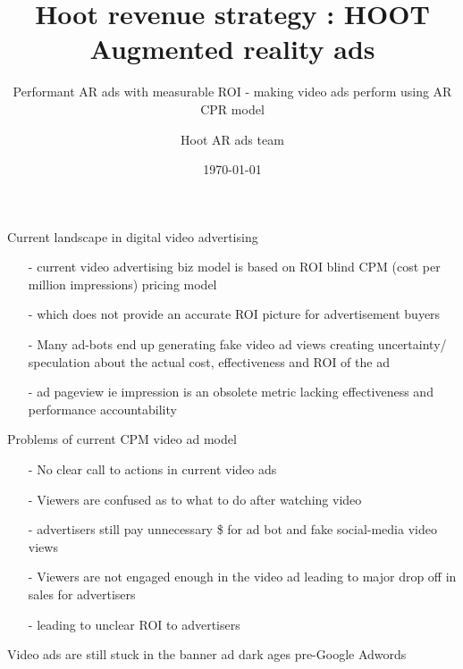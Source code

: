 \documentclass[12pt]{beamer}
\title{ Hoot revenue strategy : HOOT Augmented reality ads}
\subtitle{Performant AR ads with measurable ROI  - making video ads perform using AR CPR model}
\date{\today}
\author{Hoot AR ads team}
\institute{Hoot Live inc., a Delaware C-corp}
\begin{document}
\maketitle



\begin{frame}[fragile]{Current landscape in digital video advertising}

\begin{itemize}
\item[-]current video advertising biz model is based on ROI blind CPM (cost per million impressions) pricing model
\item[-]which does not provide an accurate ROI picture for advertisement buyers
  \pause
\item[-]Many ad-bots end up generating fake video ad views creating uncertainty/ speculation about the actual cost, effectiveness and ROI of the ad
\pause
\item[-]ad pageview ie impression is an obsolete metric lacking effectiveness and performance accountability
\end{itemize}

\end{frame}
\begin{frame}[t]{Problems of current CPM video ad model}
\begin{itemize}
\item[-]No clear call to actions in current video ads
\pause
\item[-]Viewers are confused as to what to do after watching video
\pause
\item[-]advertisers still pay unnecessary \$ for ad bot  and fake social-media video views
\pause
\item[-]Viewers are not engaged enough in the video ad leading to  major drop off in sales for advertisers
\pause
\item[-]leading to unclear ROI to advertisers
\end{itemize}
\pause
Video ads are still stuck in the banner ad dark ages pre-Google Adwords

\end{frame}
\end{document}
